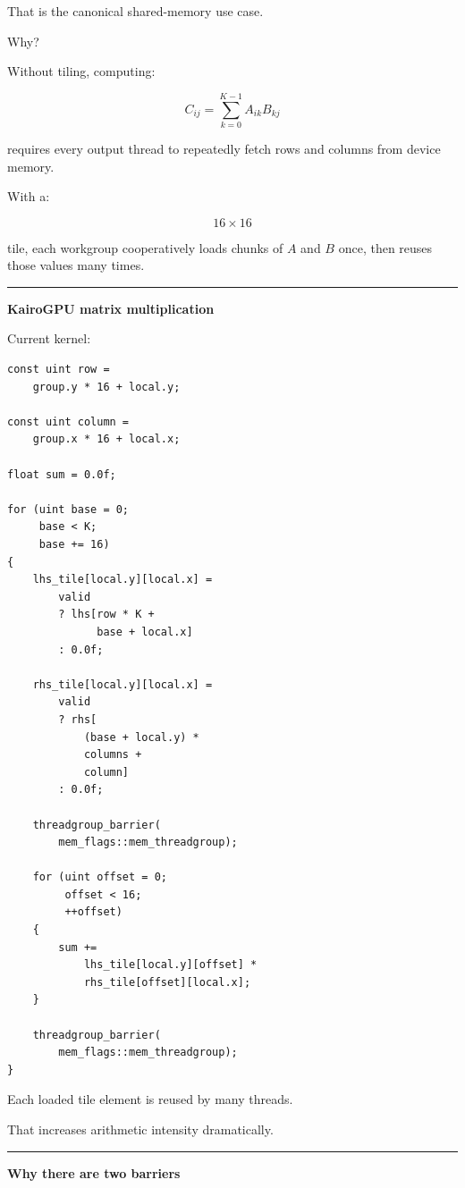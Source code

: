 That is the canonical shared-memory use case.

Why?

Without tiling, computing:

\[
C_{ij}
=
\sum_{k=0}^{K-1}
A_{ik}B_{kj}
\]

requires every output thread to repeatedly fetch rows and columns from device memory.

With a:

\[
16\times16
\]

tile, each workgroup cooperatively loads chunks of \(A\) and \(B\) once, then reuses those values many times.

\begin{center}\rule{0.5\linewidth}{0.5pt}\end{center}

\textbf{KairoGPU matrix multiplication}

Current kernel:

\protect{}\label{tun1bn}%
\begin{verbatim}
const uint row =
    group.y * 16 + local.y;

const uint column =
    group.x * 16 + local.x;

float sum = 0.0f;

for (uint base = 0;
     base < K;
     base += 16)
{
    lhs_tile[local.y][local.x] =
        valid
        ? lhs[row * K +
              base + local.x]
        : 0.0f;

    rhs_tile[local.y][local.x] =
        valid
        ? rhs[
            (base + local.y) *
            columns +
            column]
        : 0.0f;

    threadgroup_barrier(
        mem_flags::mem_threadgroup);

    for (uint offset = 0;
         offset < 16;
         ++offset)
    {
        sum +=
            lhs_tile[local.y][offset] *
            rhs_tile[offset][local.x];
    }

    threadgroup_barrier(
        mem_flags::mem_threadgroup);
}
\end{verbatim}

Each loaded tile element is reused by many threads.

That increases arithmetic intensity dramatically.

\begin{center}\rule{0.5\linewidth}{0.5pt}\end{center}

\textbf{Why there are two barriers}

